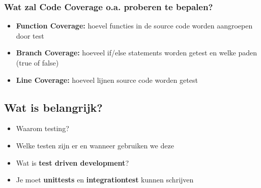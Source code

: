 \documentclass{article}
\begin{document}
\subsubsection{Wat zal Code Coverage o.a. proberen te bepalen?}

\begin{itemize}
    \item \textbf{Function Coverage:} hoevel functies in de source code worden aangroepen door test
    \item \textbf{Branch Coverage:} hoeveel if/else statements worden getest en welke paden (true of false)
    \item \textbf{Line Coverage:} hoeveel lijnen source code worden getest
\end{itemize}

\subsection{Wat is belangrijk?}

\begin{itemize}
    \item Waarom testing?
    \item Welke testen zijn er en wanneer gebruiken we deze
    \item Wat is \textbf{test driven development}?
    \item Je moet \textbf{unittests} en \textbf{integrationtest} kunnen schrijven
\end{itemize}
\end{document}

